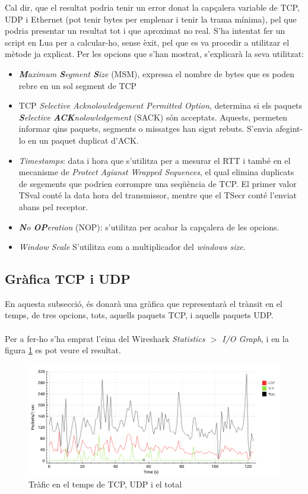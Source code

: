 \documentclass{article}
\begin{document}
Cal dir, que el resultat podria tenir un error donat la capçalera variable de
TCP, UDP i Ethernet (pot tenir bytes per emplenar i tenir la trama mínima), pel
que podria presentar un resultat tot i que aproximat no real. S'ha intentat fer
un script en Lua per a calcular-ho, sense èxit, pel que es va procedir a utilitzar
el mètode ja explicat.
Per les opcions que s'han mostrat, s'explicarà la seva utilitzat:
\begin{itemize}
\item \textit{\textbf{M}aximum \textbf{S}egment \textbf{S}ize} (MSM), expressa
el nombre de bytes que es poden rebre en un sol segment de TCP
\item TCP \textit{Selective Acknolowledgement Permitted Option},
determina si els paquets \textit{\textbf{S}elective \textbf{ACK}nolowledgement}
(SACK) són acceptats. Aquests, permeten informar qins paquets, segments o 
missatges han sigut rebuts. S'envia afegint-lo en un paquet duplicat d'ACK.
\item \textit{Timestamps}: data i hora 	que s'utilitza per a mesurar el
RTT i també en el mecanisme de \textit{Protect Agianst Wrapped Sequences},
el qual elimina duplicats de segements que podrien corrompre una seqüència de
TCP. El primer valor TSval conté la data  hora del transmissor, mentre que
el TSecr conté l'enviat abans pel receptor.
\item \textit{\textbf{N}o \textbf{OP}eration} (NOP): s'utilitza per acabar la
capçalera de les opcions.
\item \textit{Window Scale} S'utilitza com a multiplicador del \textit{windows
size}.
\end{itemize}
\subsection{Gràfica TCP i UDP}
En aquesta subsecció, és donarà una gràfica que representarà el trànsit en
el temps, de tres opcions, tots, aquells paquets TCP, i aquells paquets UDP.\\
\\
Per a fer-ho s'ha emprat l'eina del Wireshark \textit{Statistics $>$ I/O Graph},
i en la figura \ref{grp:traffic} es pot veure el resultat.
\begin{figure}[!h]
\centering
\includegraphics[scale=0.5]{grp.png}
\caption{Tràfic en el temps de TCP, UDP i el total}
\label{grp:traffic}
\end{figure}
\end{document}
